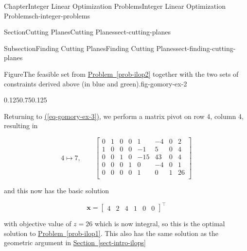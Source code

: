 \documentclass[oneside,10pt,]{book}
\newcommand{\xreffont}{\relax}
\numberwithin{equation}{section}
\newcommand{\amp}{&}
\begin{document}
\begin{chapterptx}{Chapter}{Integer Linear Optimization Problems}{}{Integer Linear Optimization Problems}{}{}{ch-integer-problems}
\begin{sectionptx}{Section}{Cutting Planes}{}{Cutting Planes}{}{}{sect-cutting-planes}
\begin{subsectionptx}{Subsection}{Finding Cutting Planes}{}{Finding Cutting Planes}{}{}{sect-finding-cutting-planes}
\begin{figureptx}{Figure}{The feasible set from \hyperref[prob-ilop2]{Problem~{\xreffont\ref{prob-ilop2}}} together with the two sets of constraints derived above (in blue and green).}{fig-gomory-ex-2}{}
\begin{image}{0.125}{0.75}{0.125}{}
{%
}%
\end{image}%
\tcblower
\end{figureptx}%
Returning to \hyperref[eq-gomory-ex-3]{({\xreffont\ref{eq-gomory-ex-3}})}, we perform a matrix pivot on row 4, column 4, resulting in%
\par
%
\begin{equation*}
4 \mapsto 7, \qquad \left[\begin{array}{rr|rrrrr|r} 0 \amp 1 \amp 0 \amp 0 \amp 1 \amp -4 \amp 0 \amp 2\\ 1 \amp 0 \amp 0 \amp 0 \amp -1 \amp 5 \amp 0 \amp 4\\ 0 \amp 0 \amp 1 \amp 0 \amp -15 \amp 43 \amp 0 \amp 4\\ 0 \amp 0 \amp 0 \amp 1 \amp 0 \amp -4 \amp 0 \amp 1\\ \hline 0 \amp 0 \amp 0 \amp 0 \amp 1 \amp 0 \amp 1 \amp 26\\ \end{array} \right]
\end{equation*}
%
\par
and this now has the basic solution%
\par
%
\begin{equation*}
\boldsymbol{x} = \left[\begin{array}{rr|rrrr}4 \amp 2 \amp 4 \amp 1 \amp 0 \amp 0 \end{array}\right]^{\intercal}
\end{equation*}
%
\par
with objective value of \(z=26\) which is now integral, so this is the optimal solution to \hyperref[prob-ilop1]{Problem~{\xreffont\ref{prob-ilop1}}}.  This also has the same solution as the geometric argument in \hyperref[sect-intro-ilops]{Section~{\xreffont\ref{sect-intro-ilops}}}%

\end{subsectionptx}
\end{sectionptx}
\end{chapterptx}
\end{document}
